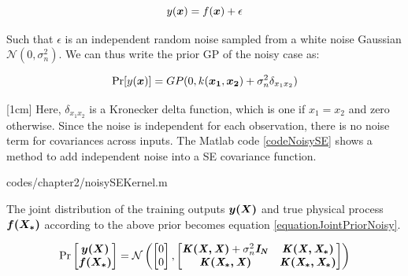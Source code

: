 \begin{equation}\label{eqNoiseEquation}
y(\boldsymbol{x}) = f(\boldsymbol{x}) + \epsilon
\end{equation}

Such that $\epsilon$ is an independent random noise sampled from a white noise Gaussian $\mathcal{N}(0, \sigma_{n}^{2})$. We can thus write the prior GP of the noisy case as:

\begin{equation}\label{equationMecanZeroGPNoisydefinition}
\Pr[y(\boldsymbol{x})] = GP(0 , k(\boldsymbol{x_1}, \boldsymbol{x_2}) + \sigma^{2}_{n}\delta_{x_{1}x_{2}})
\end{equation}

[1cm]
Here, $\delta_{x_{1}x_{2}}$ is a Kronecker delta function, which is one if $x_1 = x_2$ and zero otherwise. Since the noise is independent for each observation, there is no noise term for covariances across inputs. The Matlab code \ref{codeNoisySE} shows a method to add independent noise into a SE covariance function. 

\begin{mdframed}[hidealllines=true,backgroundcolor=lightgray!20]

                    {codes/chapter2/noisySEKernel.m}
\end{mdframed}

The joint distribution of the training outputs $\boldsymbol{y(X)}$ and true physical process $\boldsymbol{f(X_{*})}$ according to the above prior becomes equation \ref{equationJointPriorNoisy}.

\begin{equation}\label{equationJointPriorNoisy}
\Pr\left [ \begin{matrix}
\boldsymbol{y(X)}
\\ \boldsymbol{f(X_{*})}
\end{matrix} \right ]
= 
\mathcal{N}\left (
\left [ \begin{matrix}
0
\\ 0

\end{matrix} \right ] , \left [ \begin{matrix}
\bm{\mathit{K(X, X)}} + \sigma^{2}_{n}\bm{\mathit{I_N}} & \bm{\mathit{K(X, X_{*})}}\\ 
\bm{\mathit{K(X_{*}, X)}} & \bm{\mathit{K(X_{*}, X_{*})}}
\end{matrix} \right ] 
\right )
\end{equation}

